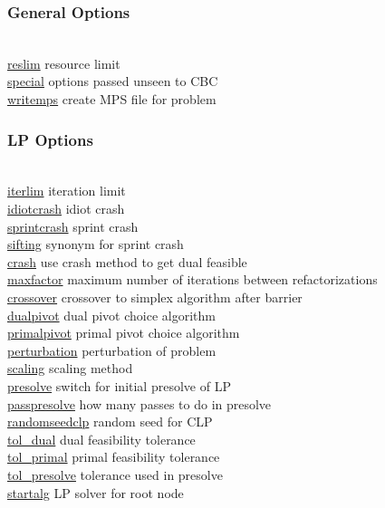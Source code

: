 
\subsubsection{General Options}
\begin{tabbing}
\hspace {1.3in} \= \\
\hyperlink{reslim}
{reslim} \> resource limit \\
\hyperlink{special}
{special} \> options passed unseen to CBC \\
\hyperlink{writemps}
{writemps} \> create MPS file for problem
\end{tabbing}

\subsubsection{LP Options}
\begin{tabbing}
\hspace {1.3in} \= \\
\hyperlink{iterlim}
{iterlim} \> iteration limit \\
\hyperlink{idiotcrash}
{idiotcrash} \> idiot crash \\
\hyperlink{sprintcrash}
{sprintcrash} \> sprint crash \\
\hyperlink{sifting}
{sifting} \> synonym for sprint crash \\
\hyperlink{crash}
{crash} \> use crash method to get dual feasible \\
\hyperlink{maxfactor}
{maxfactor} \> maximum number of iterations between refactorizations \\
\hyperlink{crossover}
{crossover} \> crossover to simplex algorithm after barrier \\
\hyperlink{dualpivot}
{dualpivot} \> dual pivot choice algorithm \\
\hyperlink{primalpivot}
{primalpivot} \> primal pivot choice algorithm \\
\hyperlink{perturbation}
{perturbation} \> perturbation of problem \\
\hyperlink{scaling}
{scaling} \> scaling method \\
\hyperlink{presolve}
{presolve} \> switch for initial presolve of LP \\
\hyperlink{passpresolve}
{passpresolve} \> how many passes to do in presolve \\
\hyperlink{randomseedclp}
{randomseedclp} \> random seed for CLP \\
\hyperlink{tol_dual}
{tol\_dual} \> dual feasibility tolerance \\
\hyperlink{tol_primal}
{tol\_primal} \> primal feasibility tolerance \\
\hyperlink{tol_presolve}
{tol\_presolve} \> tolerance used in presolve \\
\hyperlink{startalg}
{startalg} \> LP solver for root node
\end{tabbing}


